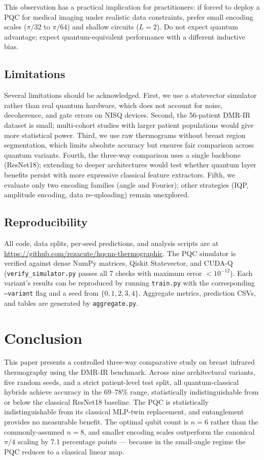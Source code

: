 \documentclass[conference]{IEEEtran}
\begin{document}
This observation has a practical implication for practitioners: if forced to deploy a PQC for medical imaging under realistic data constraints, prefer small encoding scales ($\pi/32$ to $\pi/64$) and shallow circuits ($L = 2$). Do not expect quantum advantage; expect quantum-equivalent performance with a different inductive bias.

\subsection{Limitations}
Several limitations should be acknowledged. First, we use a statevector simulator rather than real quantum hardware, which does not account for noise, decoherence, and gate errors on NISQ devices. Second, the 56-patient DMR-IR dataset is small; multi-cohort studies with larger patient populations would give more statistical power. Third, we use raw thermograms without breast region segmentation, which limits absolute accuracy but ensures fair comparison across quantum variants. Fourth, the three-way comparison uses a single backbone (ResNet18); extending to deeper architectures would test whether quantum layer benefits persist with more expressive classical feature extractors. Fifth, we evaluate only two encoding families (angle and Fourier); other strategies (IQP, amplitude encoding, data re-uploading) remain unexplored.

\subsection{Reproducibility}
All code, data splits, per-seed predictions, and analysis scripts are at \url{https://github.com/rezacute/hqcnn-thermographic}. The PQC simulator is verified against dense NumPy matrices, Qiskit Statevector, and CUDA-Q (\texttt{verify\_simulator.py} passes all 7 checks with maximum error $< 10^{-12}$). Each variant's results can be reproduced by running \texttt{train.py} with the corresponding \texttt{--variant} flag and a seed from $\{0, 1, 2, 3, 4\}$. Aggregate metrics, prediction CSVs, and tables are generated by \texttt{aggregate.py}.

\section{Conclusion}
This paper presents a controlled three-way comparative study on breast infrared thermography using the DMR-IR benchmark. Across nine architectural variants, five random seeds, and a strict patient-level test split, all quantum-classical hybrids achieve accuracy in the 69--78\% range, statistically indistinguishable from or below the classical ResNet18 baseline. The PQC is statistically indistinguishable from its classical MLP-twin replacement, and entanglement provides no measurable benefit. The optimal qubit count is $n = 6$ rather than the commonly-assumed $n = 8$, and smaller encoding scales outperform the canonical $\pi/4$ scaling by 7.1 percentage points — because in the small-angle regime the PQC reduces to a classical linear map.
\end{document}
